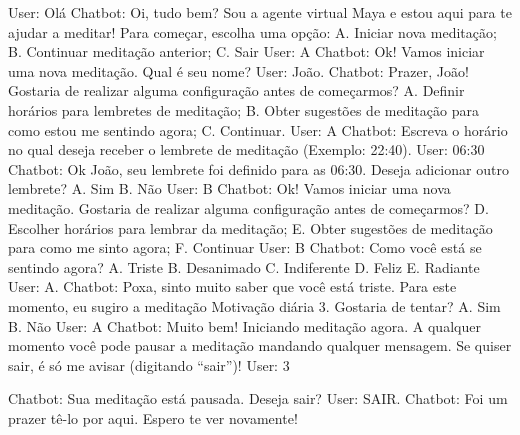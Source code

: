 User: Olá
Chatbot: Oi, tudo bem? Sou a agente virtual Maya e estou aqui para te ajudar a meditar!
Para começar, escolha uma opção:
A. Iniciar nova meditação;
B. Continuar meditação anterior;
C. Sair
User: A
Chatbot: Ok! Vamos iniciar uma nova meditação. Qual é seu nome?
User: João.
Chatbot: Prazer, João! Gostaria de realizar alguma configuração antes de começarmos?
A. Definir horários para lembretes de meditação;
B. Obter sugestões de meditação para como estou me sentindo agora;
C. Continuar.
User: A
Chatbot: Escreva o horário no qual deseja receber o lembrete de meditação (Exemplo:
22:40).
User: 06:30
Chatbot: Ok João, seu lembrete foi definido para as 06:30. Deseja adicionar outro
lembrete?
A. Sim
B. Não
User: B
Chatbot: Ok! Vamos iniciar uma nova meditação. Gostaria de realizar alguma configuração
antes de começarmos?
D. Escolher horários para lembrar da meditação;
E. Obter sugestões de meditação para como me sinto agora;
F. Continuar
User: B
Chatbot: Como você está se sentindo agora?
A. Triste
B. Desanimado
C. Indiferente
D. Feliz
E. Radiante
User: A.
Chatbot: Poxa, sinto muito saber que você está triste. Para este momento, eu sugiro a
meditação Motivação diária 3. Gostaria de tentar?
A. Sim
B. Não
User: A
Chatbot: Muito bem! Iniciando meditação agora. A qualquer momento você pode pausar a
meditação mandando qualquer mensagem. Se quiser sair, é só me avisar (digitando “sair”)!
User: 3

Chatbot: Sua meditação está pausada. Deseja sair?
User: SAIR.
Chatbot: Foi um prazer tê-lo por aqui. Espero te ver novamente!